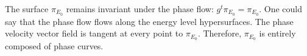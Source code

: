 The surface $\pi_{E_0}$ remains invariant under the phase flow: $g^t \pi_{E_0} = \pi_{E_0}$. One could say that the phase flow flows along the energy level hypersurfaces. The phase velocity vector field is tangent at every point to $\pi_{E_0}$. Therefore, $\pi_{E_0}$ is entirely composed of phase curves.
